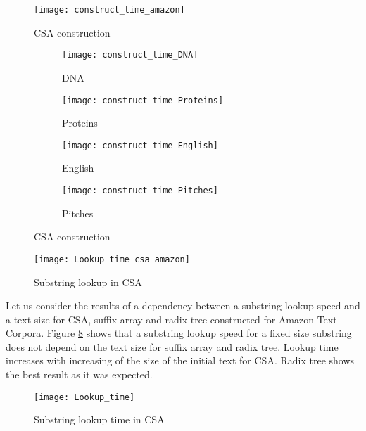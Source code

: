 \begin{figure}[h!]
	\centering
	\texttt{[image: construct\_time\_amazon]}
	\caption{CSA construction}
	\label{fig:CSA_construct_time_amazon}
\end{figure}

\begin{figure}[h!]
	\centering
	\begin{subfigure}[b]{0.49\textwidth}
		\centering
		\texttt{[image: construct\_time\_DNA]}
		\caption{DNA}
		\label{fig:y equals x}
	\end{subfigure}
	\hfill
	\begin{subfigure}[b]{0.49\textwidth}
		\centering
		\texttt{[image: construct\_time\_Proteins]}
		\caption{Proteins}
		\label{fig:three sin x}
	\end{subfigure}
	\hfill
	\begin{subfigure}[b]{0.49\textwidth}
		\centering
		\texttt{[image: construct\_time\_English]}
		\caption{English}
		\label{fig:three sin x}
	\end{subfigure}
	\hfill
	\begin{subfigure}[b]{0.49\textwidth}
		\centering
		\texttt{[image: construct\_time\_Pitches]}
		\caption{Pitches}
		\label{fig:three sin x}
	\end{subfigure}
	\caption{CSA construction}
	\label{fig:three graphs}
\end{figure}

\begin{figure}[h!]
	\centering
	\texttt{[image: Lookup\_time\_csa\_amazon]}
	\caption{Substring lookup in CSA}
	\label{fig:CSA_Lookup_time_csa_amazon}
\end{figure}

\clearpage
\newpage

Let us consider the results of a dependency between a substring lookup speed and a text size for CSA,
suffix array and radix tree constructed for Amazon Text Corpora. Figure \ref{fig:CSA_Lookup_time}
shows that a substring lookup speed for a fixed size substring does not depend on the text size for
suffix array and radix tree. Lookup time increases with increasing of the size of the initial text for CSA.
Radix tree shows the best result as it was expected.

\begin{figure}[h!]
	\centering
	\texttt{[image: Lookup\_time]}
	\caption{Substring lookup time in CSA}
	\label{fig:CSA_Lookup_time}
\end{figure}
